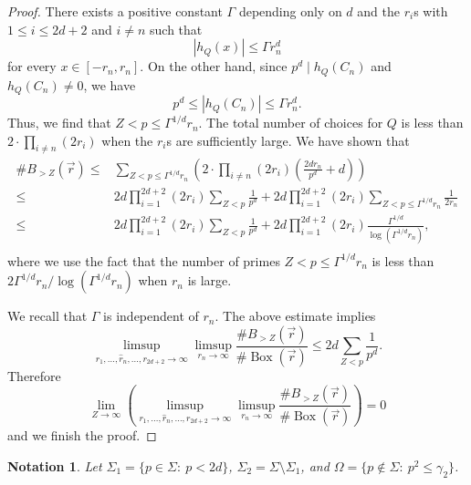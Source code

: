 \documentclass[12pt]{amsart}
\newtheorem{notn}[theorem]{Notation}
\newcommand{\op}[1]{\operatorname{#1}}
\numberwithin{equation}{section}
\begin{document}
\begin{proof}
    There exists a positive constant $\Gamma$ depending only on $d$ and the $r_i$s with $1\leq i\leq 2d+2$ and $i\neq n$ such that 
    \[|h_Q(x)|\leq \Gamma r_n^d\] 
    for every $x\in[-r_n,r_n]$.
    On the other hand, since $p^d\mid h_Q(C_n)$ 
    and $h_Q(C_n)\neq 0$, we have 
    \[p^d\leq |h_Q(C_n)|\leq \Gamma r_n^d.\]
    Thus, we find that $Z<p\leq \Gamma^{1/d} r_{n}$. The total number of choices for $Q$ is less than $2\cdot\prod_{i\neq n} (2r_i)$ when the $r_i$s are sufficiently large. We have shown that \[\begin{split}\#B_{>Z}(\vec{r})\leq & \sum_{Z<p\leq \Gamma^{1/d} r_n} \left(2\cdot\prod_{i\neq n} (2r_i)\left(\frac{2d r_{n}}{p^d}+ d\right)\right)  \\
    \leq & 2d\prod_{i=1}^{2d+2} (2r_i)\sum_{Z<p} \frac{1}{p^d}+ 2d\prod_{i=1}^{2d+2} (2r_i) \sum_{Z<p\leq \Gamma^{1/d}r_n} \frac{1}{2r_n}\\
     \leq & 2d\prod_{i=1}^{2d+2} (2r_i)\sum_{Z<p} \frac{1}{p^d}+ 2d\prod_{i=1}^{2d+2} (2r_i) \frac{\Gamma^{1/d}}{\log(\Gamma^{1/d}r_{n})},\\
    \end{split}\]
    where we use the fact that the number of primes $Z<p\leq \Gamma^{1/d}r_n$ is less than
    $2\Gamma^{1/d}r_n/\log(\Gamma^{1/d}r_n)$ when $r_n$ is large.

     We recall that $\Gamma$ is independent of $r_n$. The above estimate implies
    $$\limsup_{r_1, \dots, \hat{r}_n, \dots, r_{2d+2}\rightarrow\infty} \limsup_{r_{n}\rightarrow \infty}\frac{\#B_{>Z}(\vec{r})}{\# \op{Box}(\vec{r})}\leq 2d\sum_{Z<p}\frac{1}{p^d}.$$
    Therefore
    \[\lim_{Z\rightarrow \infty}\left(\limsup_{r_1, \dots, \hat{r}_n, \dots, r_{2d+2}\rightarrow\infty} \limsup_{r_{n}\rightarrow \infty}  \frac{\#B_{>Z}(\vec{r}) }{\# \op{Box}(\vec{r})}\right)=0\]
    and we finish the proof. 
\end{proof}

\begin{notn}
   Let $\Sigma_1=\{p\in\Sigma:\ p<2d\}$, $\Sigma_2=\Sigma\setminus\Sigma_1$, and $\Omega=\{p\notin\Sigma:\ p^2\leq \gamma_2\}$. 
\end{notn}
\end{document}
